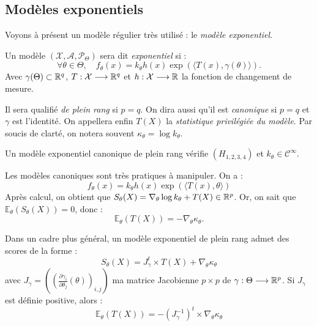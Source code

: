 \subsection{Modèles exponentiels}

Voyons à présent un modèle régulier très utilisé : le \emph{modèle exponentiel}. 

\begin{definition}
    Un modèle $( \mathcal{X}, \mathcal{A}, \mathcal{P}_\Theta)$ sera dit \emph{exponentiel} si : 
        $$ \boxed{\forall \theta \in \Theta, \quad f_\theta(x) = k_\theta h(x) \exp \left( \langle T(x), \gamma(\theta) \rangle\right).} $$
    Avec $ \gamma( \Theta) \subset \mathbb{R}^q$, $T : \mathcal{X} \longrightarrow \mathbb{R}^q$ et 
    $h : \mathcal{X} \longrightarrow \mathbb{R}$ la fonction de changement de mesure. 

    Il sera qualifié \emph{de plein rang} si $p=q$. On dira aussi qu'il est \emph{canonique} si $ p=q$ et 
    $ \gamma$ est l'identité. On appellera enfin $T(X)$ la \emph{statistique privilégiée du modèle}. 
    Par soucis de clarté, on notera souvent $ \kappa_\theta = \log k_\theta$. 
\end{definition}

\begin{theorem}[Régularité]
    Un modèle exponentiel canonique de plein rang vérifie $(H_{1, 2, 3, 4})$ et $ k_\theta \in \mathcal{C}^\infty$.
\end{theorem}

\begin{proposition}
    Les modèles canoniques sont très pratiques à manipuler. On a :  
        $$ f_\theta(x) = k_\theta h(x) \exp \left( \langle T(x), \theta \rangle\right) $$ 
    Après calcul, on obtient que $S_\theta(X) = \nabla_\theta \log k_\theta + T(X) \in \mathbb{R}^p$. 
    Or, on sait que $ \mathbb{E}_\theta(S_\theta(X)) = 0$, donc : 
        $$ \mathbb{E}_\theta(T(X)) = - \nabla_\theta \kappa_\theta. $$
\end{proposition}

\begin{prop}
    Dans un cadre plus général, un modèle exponentiel de plein rang admet des scores de la forme : 
        $$ S_\theta(X) = J_{ \gamma}^t \times T(X) + \nabla_\theta \kappa_\theta $$ 
    avec $ \displaystyle J_{\gamma} = \left( \left( \frac{\partial \gamma_i}{ \partial \theta_j} (\theta)\right)_{i,j}\right)$ 
    ma matrice Jacobienne $ p \times p$ de $ \gamma : \Theta \longrightarrow \mathbb{R}^p$. 
    Si $J_{\gamma}$ est définie positive, alors : 
        $$ \mathbb{E}_\theta(T(X)) = - \left( J_\gamma ^{-1}\right)^t \times \nabla_\theta \kappa_\theta $$
\end{prop}

